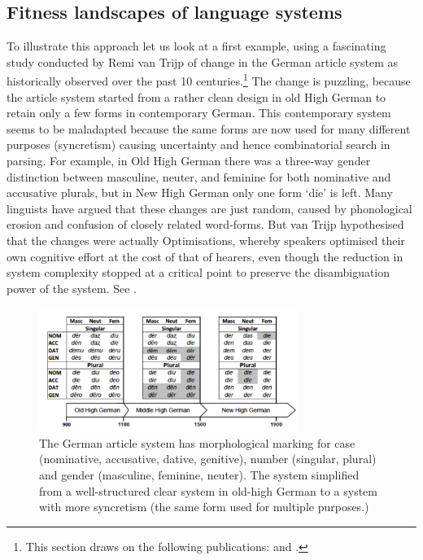 \subsection{Fitness landscapes of language systems}

To illustrate this approach let us look at a first example, 
using a fascinating study conducted by Remi van Trijp of change in the German article system as historically 
observed over the past 10 centuries.\footnote{
This section draws on the following publications: \cite{VanTrijp:2013} and \cite{VanTrijp:2013b}.}
The change is puzzling, because the article system started from a rather clean 
design in old High German to retain only a few forms in contemporary German. This contemporary system 
seems to be maladapted because the same forms are now used for many different purposes (syncretism) causing 
uncertainty and hence combinatorial search in parsing. For example, in Old High German there was a three-way gender 
distinction between masculine, neuter, and feminine for both nominative and accusative plurals, but in New 
High German only one form `die' is left. 
Many linguists have argued that these changes are just random, caused by phonological erosion and confusion 
of closely related word-forms. But van Trijp hypothesised that the changes 
were actually Optimisations, whereby speakers optimised their own cognitive effort at the cost of that of
hearers, even though the reduction in system complexity stopped 
at a critical point to preserve the disambiguation power of the system. See . 

\begin{figure}[htb!]
\centerline{
\includegraphics[width=0.75\textwidth]{chap12/figs/german-system.pdf}
}
\caption{{The German article system has morphological marking for case (nominative, accusative, dative, 
genitive), number (singular, plural) and gender (masculine, feminine, neuter). The system simplified 
from a well-structured clear system in old-high German to a system with more syncretism (the same form used
for multiple purposes.) }
\label{fig:german}
} 
\end{figure}

